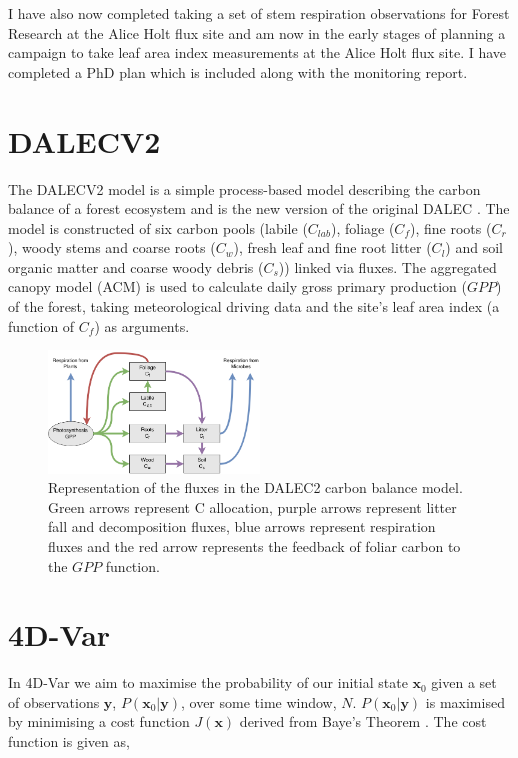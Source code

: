 \documentclass[11pt]{article}
\begin{document}
I have also now completed taking a set of stem respiration observations for Forest Research at the Alice Holt flux site and am now in the early stages of planning a campaign to take leaf area index measurements at the Alice Holt flux site. I have completed a PhD plan which is included along with the monitoring report.            

\section{DALECV2}

The DALECV2 model is a simple process-based model describing the carbon balance of a forest ecosystem \citep{Bloom2014} and is the new version of the original DALEC \citep{williams2005improved}. The model is constructed of six carbon pools (labile ($C_{lab}$), foliage ($C_f$), fine roots ($C_r$), woody stems and coarse roots ($C_w$), fresh leaf and fine root litter ($C_l$) and soil organic matter and coarse woody debris ($C_s$)) linked via fluxes. The aggregated canopy model (ACM) \citep{williams1997predicting} is used to calculate daily gross primary production ($GPP$) of the forest, taking meteorological driving data and the site's leaf area index (a function of $C_f$) as arguments.   

\begin{figure}[ht]
    \centering
    \includegraphics[width=0.5\textwidth]{Dalecdiagram.png}
    \caption{Representation of the fluxes in the DALEC2 carbon balance model. Green arrows represent C allocation, purple arrows represent litter fall and decomposition fluxes, blue arrows represent respiration fluxes and the red arrow represents the feedback of foliar carbon to the $GPP$ function.}
    \label{fig:DALEC_mod}
\end{figure}

\section{4D-Var}

In 4D-Var we aim to maximise the probability of our initial state $\textbf{x}_0$ given a set of observations $\textbf{y}$, $P(\textbf{x}_0|\textbf{y})$, over some time window, $N$. $P(\textbf{x}_0|\textbf{y})$ is maximised by minimising a cost function $J(\textbf{x})$ derived from Baye's Theorem \citep{lewis2006dynamic}. The cost function is given as,
\end{document}
